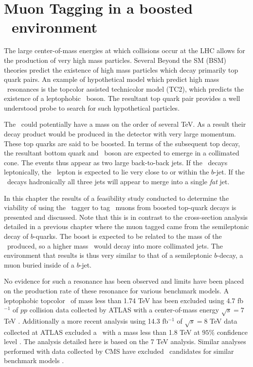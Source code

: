 \chapter{Muon Tagging in a boosted \ttbar\ environment} \label{sec:boosted_study}

The large center-of-mass energies at which collisions occur at the LHC allows for the production of very high mass particles. Several Beyond the SM (BSM) theories predict the existence of high mass particles which decay primarily top quark pairs.
An example of hypothetical model which predict high mass \ttbar\ resonances is the topcolor assisted technicolor model (TC2), which predicts the existence of a leptophobic \Zprime\ boson. The resultant top quark pair provides a well understood probe to search for such hypothetical particles. 

The \Zprime\ could potentially have a mass on the order of several TeV. As a result their decay product would be produced in the detector with very large momentum. These top quarks are said to be boosted. In terms of the subsequent top decay, the resultant bottom quark and \W\ boson are expected to emerge in a collimated cone. The events thus appear as two large back-to-back jets. If the \W\ decays leptonically, the \W\ lepton is expected to lie very close to or within the $b$-jet. If the \W\ decays hadronically all three jets will appear to merge into a single \textit{fat} jet.

In this chapter the results of a feasibility study conducted to determine the viability of using the \xsm\ tagger to tag \W\ muons from boosted top-quark decays is presented and discussed. Note that this is in contrast to the cross-section analysis detailed in a previous chapter where the muon tagged came from the semileptonic decay of $b$-quarks. The boost is expected to be related to the mass of the \Zprime\ produced, so a higher mass \Zprime\ would decay into more collimated jets. The environment that results is thus very similar to that of a semileptonic $b$-decay, a muon buried inside of a $b$-jet.

No evidence for such a resonance has been observed and limits have been placed on the production rate of these resonance for various benchmark models. A leptophobic topcolor \Zprime\ of mass less than 1.74 TeV has been excluded using 4.7 fb$^{-1}$ of $pp$ collision data collected by ATLAS with a center-of-mass energy $\sqrt{s}=7$ TeV \cite{Boosted:ATLASExclusion7TeV}. Additionally a more recent analysis using 14.3 fb$^{-1}$ of $\sqrt{s}=8$ TeV data collected at ATLAS excluded a \Zprime\ with a mass less than 1.8 TeV at $95\%$ confidence level \cite{Boosted:ATLASExclusion8TeV}.  The analysis detailed here is based on the 7 TeV analysis. Similar analyses performed with data collected by CMS have excluded \Zprime\ candidates for similar benchmark models \cite{Boosted:CMSSearch7TeVDilepton,Boosted:CMSSearchAnomalous,Boosted:CMSSearch8TeV}. 

